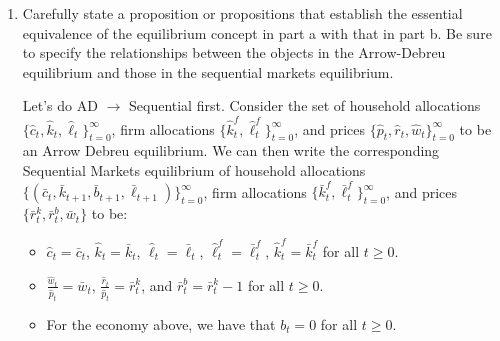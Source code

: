 \documentclass[11pt,english]{article}
\begin{document}
\begin{enumerate}[label=(\alph*)]
\begin{solution}
\begin{itemize}
\item \underline{Market Clearing:} The household and firm allocations also satisfy \begin{align*}
\text{Goods Market:}&\quad \hat{c}_t + \hat{k}_{t+1}  = F(\hat{k}_t^f, \hat{\ell}_t^f) + (1 - \delta)\hat{k}_t,\forall t \geq 0,\\
\text{Capital Market:}&\quad \hat{k}_t = \hat{k}_t^f,\forall t \geq 0,\\
\text{Labor Market:}&\quad \hat{\ell}_t = \hat{\ell}_t^f, \forall t \geq 0,\\
\text{Bonds Market:}&\quad \hat{b}_{t+1} = 0 ,\forall t \geq 0.
\end{align*}
\end{itemize}
\end{solution}
    \item Carefully state a proposition or propositions that establish the essential equivalence of the equilibrium concept in part a with that in part b. Be sure to specify the relationships between the objects in the Arrow-Debreu equilibrium and those in the sequential markets equilibrium.
\begin{solution}
Let's do AD $\to $ Sequential first. Consider the set of household allocations $\{\hat{c}_t, \hat{k}_{t}, \hat{\ell}_t\}_{t=0}^\infty$, firm allocations $\{\hat{k}_t^f, \hat{\ell}_t^f\}_{t=0}^\infty$, and prices $\{\hat{p}_t, \hat{r}_t, \hat{w}_t\}_{t=0}^\infty$ to be an Arrow Debreu equilibrium. We can then write the corresponding Sequential Markets equilibrium of household allocations $\{( \bar{c}_t, \bar{k}_{t+1}, \bar{b}_{t+1}, \bar{\ell}_{t+1})\}_{t=0}^\infty$, firm allocations $\{\bar{k}_t^f, \bar{\ell}_t^f\}_{t=0}^\infty$, and prices $\{\bar{r}_t^k, \bar{r}^b_t, \bar{w}_t\}$ to be:
\begin{itemize}
\item $\hat{c}_t = \bar{c}_t$, $\hat{k}_t = \bar{k}_t$, $\hat{\ell}_t = \bar{\ell}_t$, $\hat{\ell}^f_t = \bar{\ell}_t^f$, $\hat{k}_t^f = \bar{k}_t^f$ for all $t\geq 0$.

\item $\frac{\hat{w}_t}{\hat{p}_t} = \bar{w}_t$, $\frac{\hat{r}_t}{\hat{p}_t} = \bar{r}_t^k$, and $\bar{r}_t^b = \bar{r}_t^k - 1$ for all $t \geq 0$.

\item For the economy above, we have that $b_t = 0$ for all $t\geq 0$.
\end{itemize}


\end{solution}
\end{enumerate}
\end{document}
